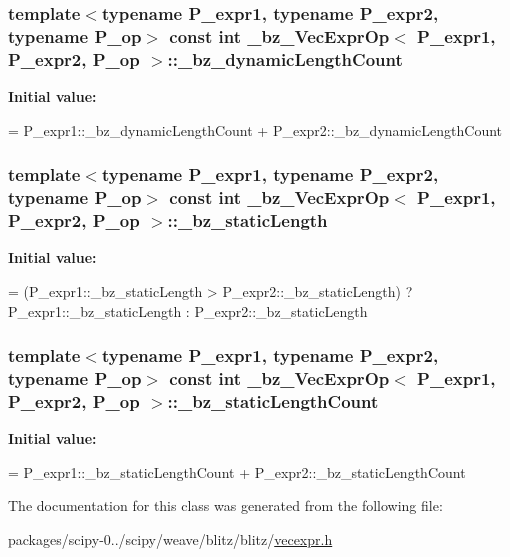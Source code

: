 \subsubsection[{\+\_\+bz\+\_\+dynamic\+Length\+Count}]{\setlength{\rightskip}{0pt plus 5cm}template$<$typename P\+\_\+expr1, typename P\+\_\+expr2, typename P\+\_\+op$>$ const int {\bf \+\_\+bz\+\_\+\+Vec\+Expr\+Op}$<$ P\+\_\+expr1, P\+\_\+expr2, P\+\_\+op $>$\+::\+\_\+bz\+\_\+dynamic\+Length\+Count\hspace{0.3cm}{\ttfamily [static]}}\label{class__bz__VecExprOp_a3bec9e168eb9499ee1da36f1e312cc86}
{\bfseries Initial value\+:}
\begin{DoxyCode}
= P\_expr1::\_bz\_dynamicLengthCount
                               + P\_expr2::\_bz\_dynamicLengthCount
\end{DoxyCode}
\hypertarget{class__bz__VecExprOp_a03cb35cdacca2c42367caf5ff83ed34b}{}
\subsubsection[{\+\_\+bz\+\_\+static\+Length}]{\setlength{\rightskip}{0pt plus 5cm}template$<$typename P\+\_\+expr1, typename P\+\_\+expr2, typename P\+\_\+op$>$ const int {\bf \+\_\+bz\+\_\+\+Vec\+Expr\+Op}$<$ P\+\_\+expr1, P\+\_\+expr2, P\+\_\+op $>$\+::\+\_\+bz\+\_\+static\+Length\hspace{0.3cm}{\ttfamily [static]}}\label{class__bz__VecExprOp_a03cb35cdacca2c42367caf5ff83ed34b}
{\bfseries Initial value\+:}
\begin{DoxyCode}
=
            (P\_expr1::\_bz\_staticLength > P\_expr2::\_bz\_staticLength) ?
            P\_expr1::\_bz\_staticLength : P\_expr2::\_bz\_staticLength
\end{DoxyCode}
\hypertarget{class__bz__VecExprOp_a455a5f2093233866fd4389d1d112b832}{}
\subsubsection[{\+\_\+bz\+\_\+static\+Length\+Count}]{\setlength{\rightskip}{0pt plus 5cm}template$<$typename P\+\_\+expr1, typename P\+\_\+expr2, typename P\+\_\+op$>$ const int {\bf \+\_\+bz\+\_\+\+Vec\+Expr\+Op}$<$ P\+\_\+expr1, P\+\_\+expr2, P\+\_\+op $>$\+::\+\_\+bz\+\_\+static\+Length\+Count\hspace{0.3cm}{\ttfamily [static]}}\label{class__bz__VecExprOp_a455a5f2093233866fd4389d1d112b832}
{\bfseries Initial value\+:}
\begin{DoxyCode}
= P\_expr1::\_bz\_staticLengthCount
                              + P\_expr2::\_bz\_staticLengthCount
\end{DoxyCode}


The documentation for this class was generated from the following file\+:\begin{DoxyCompactItemize}
\item 
packages/scipy-\/0../scipy/weave/blitz/blitz/\hyperlink{vecexpr_8h}{vecexpr.\+h}\end{DoxyCompactItemize}
